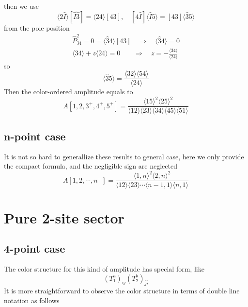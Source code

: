 \documentclass[12pt]{article}
\newcommand{\mdavg}[2]{\langle #1 \rangle\!\langle #2 \rangle}
\newcommand{\avg}[1]{\langle #1 \rangle}
\newcommand{\cbrak}[2]{\avg{#1}\![#2]}
\newcommand{\acbrak}[2]{[#1]\!\avg{#2}}
\begin{document}
then we use
\begin{equation*}
    \cbrak{2\hat{I}}{\hat{I3}}=\cbrak{24}{43},\quad \acbrak{4\hat{I}}{\hat{I}5}=\acbrak{43}{\hat{3}5}
\end{equation*}
from the pole position
\begin{gather*}
    \hat{P}_{34}^2=0=\cbrak{\hat{3}4}{43}\quad \Rightarrow \quad \avg{\hat{3}4}=0\\
    \avg{34}+z\avg{24}=0\qquad\Rightarrow\quad z=-\frac{\avg{34}}{\avg{24}}
\end{gather*}
so
\begin{equation*}
    \avg{\hat{3}5}=\frac{\mdavg{32}{54}}{\avg{24}}
\end{equation*}
Then the color-ordered amplitude equals to 
\begin{equation*}
    A[1,2,3^+,4^+,5^+]=\frac{\avg{15}^2\avg{25}^2}{\mdavg{12}{23}\!\mdavg{34}{45}\!\avg{51}}
\end{equation*}
\subsection{n-point case}
It is not so hard to generallize these results to general case, here we only provide the compact formula, and the negligible sign are neglected
\begin{equation*}
    A[1,2,\cdots,n^-]=\frac{\avg{1,n}^2\avg{2,n}^2}{\mdavg{12}{23}\cdots\mdavg{n-1,1}{n,1}}
\end{equation*} 
\section{Pure 2-site sector}
\subsection{4-point case}
The color structure for this kind of amplitude has special form, like
\begin{equation*}
    (T_1^a)_{ij}(T_2^b)_{\bar{j}\bar{i}}
\end{equation*}
It is more straightforward to observe the color structure in terms of double line notation as follows 
\vspace{0.5em}
\end{document}

